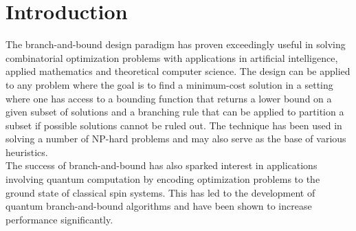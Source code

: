 
\section{Introduction}
	The branch-and-bound design paradigm has proven exceedingly useful in solving combinatorial optimization problems with applications in artificial intelligence, applied mathematics and theoretical computer science. 
	The design can be applied to any problem where the goal is to find a minimum-cost solution in a setting where one has access to a bounding function that returns a lower bound on a given subset of solutions and a branching rule that can be applied to partition a subset if possible solutions cannot be ruled out. 
	The technique has been used in solving a number of NP-hard problems and may also serve as the base of various heuristics.\\
	
	The success of branch-and-bound has also sparked interest in applications involving quantum computation by encoding optimization problems to the ground state of classical spin systems. 
	This has led to the development of quantum branch-and-bound algorithms and have been shown to increase performance significantly. 
	
	
	